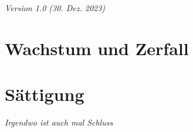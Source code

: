 


\renewcommand{\bbwAufgabenBlockID}{FctWZ}%

\renewcommand{\metaHeaderLine}{Exponentialfunktionen}
\renewcommand{\arbeitsblattTitel}{Aufgaben zu Wachstum und Zerfall}


\arbeitsblattHeader{}
\begin{center}\textit{\tiny{Version 1.0 (30. Dez. 2023)}}\end{center}

\section{Wachstum und Zerfall}














\section{Sättigung}
\textit{Irgendwo ist auch mal Schluss}








